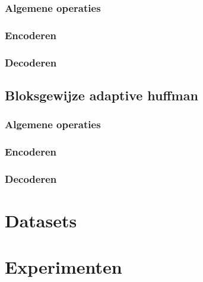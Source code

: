\documentclass[a4paper,12pt]{report}
\begin{document}
\subsection{Algemene operaties}

\subsection{Encoderen}

\subsection{Decoderen}


\section{Bloksgewijze adaptive huffman}
\subsection{Algemene operaties}

\subsection{Encoderen}

\subsection{Decoderen}


\chapter{Datasets}

\chapter{Experimenten}

\end{document}
